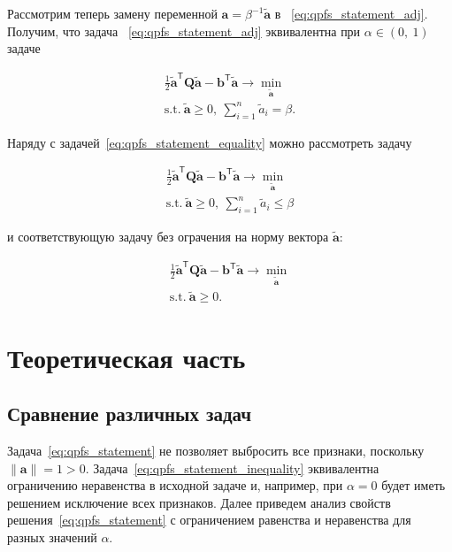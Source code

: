 \documentclass[12pt, twoside]{article}
\newcommand{\ba}{\mathbf{a}}
\newcommand{\bb}{\mathbf{b}}
\newcommand{\bQ}{\mathbf{Q}}
\newcommand{\getT}{^{\mathsf{T}}}
\begin{document}
Рассмотрим теперь замену переменной $\ba = \beta^{-1} \tilde{\ba}$ в ~\eqref{eq:qpfs_statement_adj}. Получим, что задача ~\eqref{eq:qpfs_statement_adj} эквивалентна при $\alpha \in (0,\:1)$ задаче

\begin{equation}
\begin{gathered}
\label{eq:qpfs_statement_equality}
\frac{1}{2} \tilde{\ba}\getT \bQ \tilde{\ba} - \bb\getT \tilde{\ba} \to \min_{\tilde{\ba}}\\
\text{s.t.}\: \tilde{\ba} \geq 0,\:\sum\limits_{i=1}^n \tilde{a}_i = \beta.
\end{gathered}
\end{equation}

Наряду с задачей~\eqref{eq:qpfs_statement_equality} можно рассмотреть задачу

\begin{equation}
\begin{gathered}
\label{eq:qpfs_statement_inequality}
\frac{1}{2} \tilde{\ba}\getT \bQ \tilde{\ba} - \bb\getT \tilde{\ba} \to \min_{\tilde{\ba}}\\
\text{s.t.}\: \tilde{\ba} \geq 0,\:\sum\limits_{i=1}^n \tilde{a}_i \leq \beta
\end{gathered}
\end{equation}


и соответствующую задачу без ограчения на норму вектора $\tilde{\ba}$:

\begin{equation}
\begin{gathered}
\label{eq:qpfs_statement_unconstrained}
\frac{1}{2} \tilde{\ba}\getT \bQ \tilde{\ba} - \bb\getT \tilde{\ba} \to \min_{\tilde{\ba}}\\
\text{s.t.}\: \tilde{\ba} \geq 0.
\end{gathered}
\end{equation}


\section{Теоретическая часть}

\subsection{Сравнение различных задач}


Задача~\eqref{eq:qpfs_statement} не позволяет выбросить все признаки, поскольку $\|\ba\| = 1 > 0$. Задача~\eqref{eq:qpfs_statement_inequality} эквивалентна ограничению неравенства в исходной задаче и, например, при $\alpha=0$ будет иметь решением исключение всех признаков. Далее приведем анализ свойств решения~\eqref{eq:qpfs_statement} с ограничением равенства и неравенства для разных значений $\alpha$.
\end{document}
